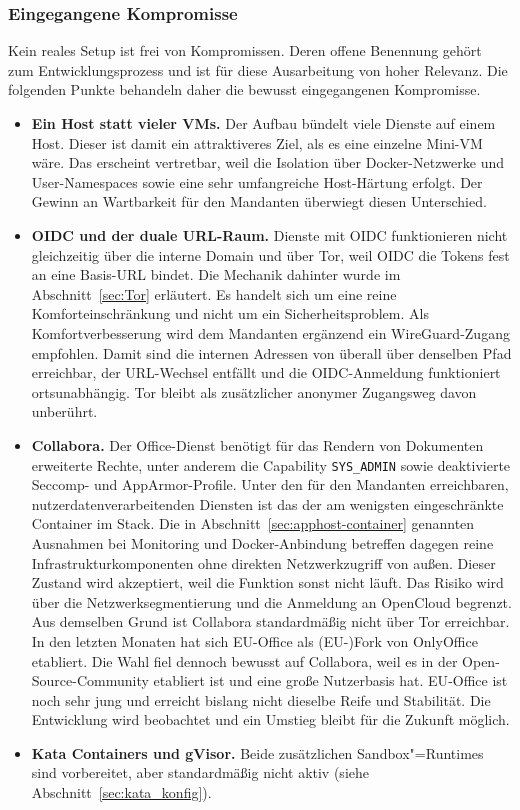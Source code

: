 \subsubsection{Eingegangene Kompromisse}\label{sec:kompromisse_apphost}

Kein reales Setup ist frei von Kompromissen. Deren offene Benennung gehört zum
Entwicklungsprozess und ist für diese Ausarbeitung von hoher Relevanz. Die
folgenden Punkte behandeln daher die bewusst eingegangenen Kompromisse.

\begin{itemize}
  \item \textbf{Ein Host statt vieler \acp{VM}.} Der Aufbau bündelt viele
    Dienste auf einem Host. Dieser ist damit ein attraktiveres Ziel, als es
    eine einzelne Mini-\ac{VM} wäre. Das erscheint vertretbar, weil die
    Isolation über Docker-Netzwerke und User-Namespaces sowie eine sehr
    umfangreiche Host-Härtung erfolgt. Der Gewinn an Wartbarkeit für den
    Mandanten überwiegt diesen Unterschied.
  \item \textbf{\ac{OIDC} und der duale \ac{URL}-Raum.} Dienste mit \ac{OIDC}
    funktionieren nicht gleichzeitig über die interne Domain und über Tor,
    weil \ac{OIDC} die Tokens fest an eine Basis-\ac{URL} bindet. Die
    Mechanik dahinter wurde im Abschnitt~\ref{sec:Tor} erläutert. Es handelt sich um
    eine reine Komforteinschränkung und nicht um ein Sicherheitsproblem. Als
    Komfortverbesserung wird dem Mandanten ergänzend ein WireGuard-Zugang
    empfohlen. Damit sind die internen Adressen von überall über denselben
    Pfad erreichbar, der \ac{URL}-Wechsel entfällt und die
    \ac{OIDC}-Anmeldung funktioniert ortsunabhängig. Tor bleibt als
    zusätzlicher anonymer Zugangsweg davon unberührt.
  \item \textbf{Collabora.} Der Office-Dienst benötigt für das Rendern von
    Dokumenten erweiterte Rechte, unter anderem die Capability
    \texttt{SYS\_ADMIN} sowie deaktivierte Seccomp- und AppArmor-Profile.
    Unter den für den Mandanten erreichbaren, nutzerdatenverarbeitenden
    Diensten ist das der am wenigsten eingeschränkte Container im Stack. Die
    in Abschnitt~\ref{sec:apphost-container} genannten Ausnahmen bei
    Monitoring und Docker-Anbindung betreffen dagegen reine
    Infrastrukturkomponenten ohne direkten Netzwerkzugriff von außen. Dieser
    Zustand wird akzeptiert, weil die Funktion sonst nicht läuft. Das Risiko
    wird über die Netzwerksegmentierung und die Anmeldung an OpenCloud
    begrenzt. Aus demselben Grund ist Collabora standardmäßig nicht über Tor
    erreichbar. In den letzten Monaten hat sich \ac{EU}-Office als
    (\ac{EU}-)Fork von OnlyOffice etabliert. Die Wahl fiel dennoch bewusst
    auf Collabora, weil es in der Open-Source-Community etabliert ist und
    eine große Nutzerbasis hat. \ac{EU}-Office ist noch sehr jung und
    erreicht bislang nicht dieselbe Reife und Stabilität. Die Entwicklung
    wird beobachtet und ein Umstieg bleibt für die Zukunft möglich.
  \item \textbf{Kata Containers und gVisor.} Beide zusätzlichen
    Sandbox"=Runtimes sind vorbereitet, aber standardmäßig nicht aktiv (siehe
    Abschnitt~\ref{sec:kata_konfig}).
\end{itemize}

